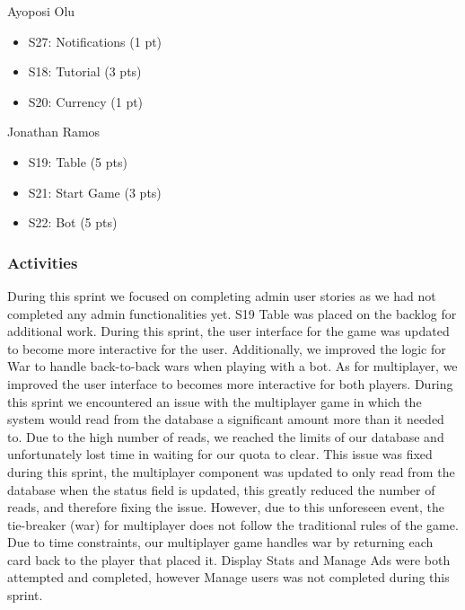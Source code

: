 Ayoposi Olu

\begin{itemize}
    \item S27: Notifications (1 pt)
    \item S18: Tutorial (3 pts)
    \item S20: Currency (1 pt)
\end{itemize}


Jonathan Ramos

\begin{itemize}
    \item S19: Table (5 pts)
    \item S21: Start Game (3 pts)
    \item S22: Bot (5 pts)
\end{itemize}

\subsubsection{Activities}
During this sprint we focused on completing admin user stories as we had not completed any admin functionalities yet. S19 Table was placed on the backlog for additional work. During this sprint, the user interface for the game was updated to become more interactive for the user. Additionally, we improved the logic for War to handle back-to-back wars when playing with a bot. As for multiplayer, we improved the user interface to becomes more interactive for both players. During this sprint we encountered an issue with the multiplayer game in which the system would read from the database a significant amount more than it needed to. Due to the high number of reads, we reached the limits of our database and unfortunately lost time in waiting for our quota to clear. This issue was fixed during this sprint, the multiplayer component was updated to only read from the database when the status field is updated, this greatly reduced the number of reads, and therefore fixing the issue. However, due to this unforeseen event, the tie-breaker (war) for multiplayer does not follow the traditional rules of the game. Due to time constraints, our multiplayer game handles war by returning each card back to the player that placed it. Display Stats and Manage Ads were both attempted and completed, however Manage users was not completed during this sprint. 


